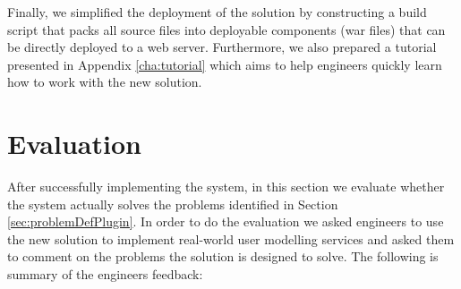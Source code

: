 Finally, we simplified the deployment of the solution by constructing a build script that packs all source files into deployable components (war files) that can be directly deployed to a web server. Furthermore, we also prepared a tutorial presented in Appendix \ref{cha:tutorial} which aims to help engineers quickly learn how to work with the new solution.

\section{Evaluation}
\label{sec:evalPlugin}

After successfully implementing the system, in this section we evaluate whether the system actually solves the problems identified in Section \ref{sec:problemDefPlugin}. In order to do the evaluation we asked engineers to use the new solution to implement real-world user modelling services and asked them to comment on the problems the solution is designed to solve. The following is summary of the engineers feedback:

